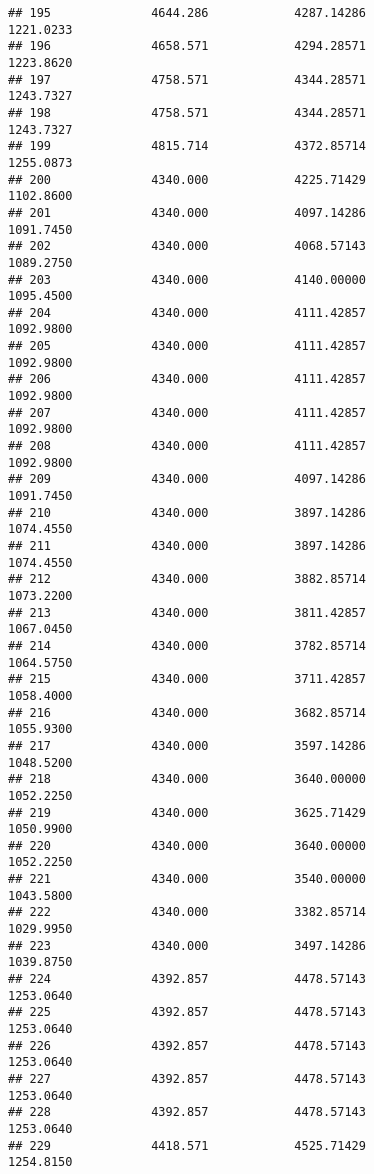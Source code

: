 \documentclass[]{article}
\begin{document}
\begin{verbatim}
## 195              4644.286            4287.14286                1221.0233
## 196              4658.571            4294.28571                1223.8620
## 197              4758.571            4344.28571                1243.7327
## 198              4758.571            4344.28571                1243.7327
## 199              4815.714            4372.85714                1255.0873
## 200              4340.000            4225.71429                1102.8600
## 201              4340.000            4097.14286                1091.7450
## 202              4340.000            4068.57143                1089.2750
## 203              4340.000            4140.00000                1095.4500
## 204              4340.000            4111.42857                1092.9800
## 205              4340.000            4111.42857                1092.9800
## 206              4340.000            4111.42857                1092.9800
## 207              4340.000            4111.42857                1092.9800
## 208              4340.000            4111.42857                1092.9800
## 209              4340.000            4097.14286                1091.7450
## 210              4340.000            3897.14286                1074.4550
## 211              4340.000            3897.14286                1074.4550
## 212              4340.000            3882.85714                1073.2200
## 213              4340.000            3811.42857                1067.0450
## 214              4340.000            3782.85714                1064.5750
## 215              4340.000            3711.42857                1058.4000
## 216              4340.000            3682.85714                1055.9300
## 217              4340.000            3597.14286                1048.5200
## 218              4340.000            3640.00000                1052.2250
## 219              4340.000            3625.71429                1050.9900
## 220              4340.000            3640.00000                1052.2250
## 221              4340.000            3540.00000                1043.5800
## 222              4340.000            3382.85714                1029.9950
## 223              4340.000            3497.14286                1039.8750
## 224              4392.857            4478.57143                1253.0640
## 225              4392.857            4478.57143                1253.0640
## 226              4392.857            4478.57143                1253.0640
## 227              4392.857            4478.57143                1253.0640
## 228              4392.857            4478.57143                1253.0640
## 229              4418.571            4525.71429                1254.8150

\end{verbatim}
\end{document}
